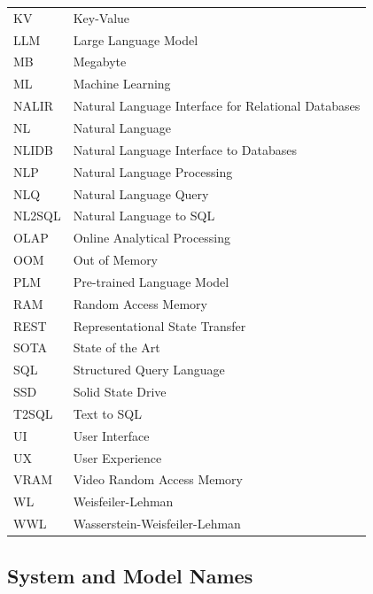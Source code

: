 \begin{tabular}{ll}
KV       & Key-Value \\
LLM      & Large Language Model \\
MB       & Megabyte \\
ML       & Machine Learning \\
NALIR    & Natural Language Interface for Relational Databases \\
NL       & Natural Language \\
NLIDB    & Natural Language Interface to Databases \\
NLP      & Natural Language Processing \\
NLQ      & Natural Language Query \\
NL2SQL   & Natural Language to SQL \\
OLAP     & Online Analytical Processing \\
OOM      & Out of Memory \\
PLM      & Pre-trained Language Model \\
RAM      & Random Access Memory \\
REST     & Representational State Transfer \\
SOTA     & State of the Art \\
SQL      & Structured Query Language \\
SSD      & Solid State Drive \\
T2SQL    & Text to SQL \\
UI       & User Interface \\
UX       & User Experience \\
VRAM     & Video Random Access Memory \\
WL       & Weisfeiler-Lehman \\
WWL      & Wasserstein-Weisfeiler-Lehman \\
\end{tabular}

\vspace{1em}

\subsection*{System and Model Names}

